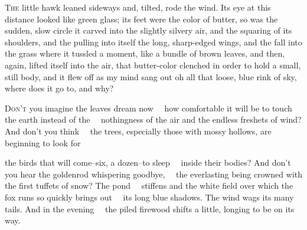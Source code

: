 \newpage %


\begin{poem}
\begin{stanza}
\textsc{The} little hawk leaned sideways and, tilted,\verseline
rode the wind. Its eye at this distance looked\verseline
like green glass; its feet were the color\verseline
of butter, so was the sudden, slow circle it carved\verseline
into the slightly silvery air, and the\verseline
squaring of its shoulders, and the pulling into\verseline
itself the long, sharp-edged wings, and the\verseline
fall into the grass where it tussled a moment,\verseline
like a bundle of brown leaves, and then, again,\verseline
lifted itself into the air, that butter-color\verseline
clenched in order to hold a small, still\verseline
body, and it flew off as my mind sang out oh\verseline
all that loose, blue rink of sky, where does\verseline
it go to, and why?
\end{stanza}
\end{poem}

\newpage %


\begin{poem}
\begin{stanza}
\textsc{Don't} you imagine the leaves dream now\verseline
~~how comfortable it will be to touch\verseline
the earth instead of the\verseline
~~nothingness of the air and the endless\verseline
freshets of wind? And don't you think\verseline
~~the trees, especially those with\verseline
mossy hollows, are beginning to look for
\end{stanza}

\begin{stanza}
the birds that will come--six, a dozen--to sleep\verseline
~~inside their bodies? And don't you hear\verseline
the goldenrod whispering goodbye,\verseline
~~the everlasting being crowned with the first\verseline
tuffets of snow? The pond\verseline
~~stiffens and the white field over which\verseline
the fox runs so quickly brings out\verseline
~~its long blue shadows. The wind wags\verseline
its many tails. And in the evening\verseline
~~the piled firewood shifts a little,\verseline
longing to be on its way.
\end{stanza}
\end{poem}

